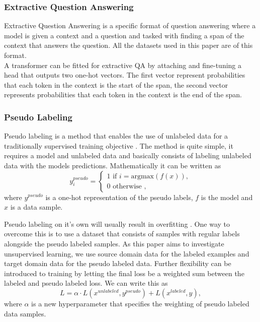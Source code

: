 \documentclass[twoside,twocolumn]{article}
\begin{document}
\subsubsection{Extractive Question Answering}
Extractive Question Answering is a specific format of question answering where a
model is given a context and a question and tasked with finding a span of the
context that answers the question. All the datasets used in this paper are of
this format. \\

A transformer can be fitted for extractive QA by attaching and
fine-tuning a head that outputs two one-hot vectors. The first vector represent
probabilities that each token in the context is the start of the span, the
second vector represents probabilities that each token in the context is the end
of the span.

\subsubsection{Pseudo Labeling}
Pseudo labeling is a method that enables the use of unlabeled data for a
traditionally supervised training objective \cite{lee2013pseudo}. The method is quite
simple, it requires a model and unlabeled data and basically consists of labeling unlabeled data with the models
predictions. Mathematically it can be written as 
\begin{equation}
\label{eq:pseudo}
	y_i^{pseudo} = 
\begin{cases}
	1 \text{ if } i = \text{argmax}(f(x)), \\
	0 \text{ otherwise },
\end{cases}
\end{equation}
where $y^{pseudo}$ is a one-hot representation of the pseudo labels, $f$ is the
model and $x$ is a data sample. 

Pseudo labeling on it's own will usually result in overfitting
\cite{lee2013pseudo}.
One way to overcome this is to use a dataset that consists of samples with
regular labels alongside the pseudo labeled samples. As this paper aims to
investigate unsupervised learning, we use source domain data for the labeled
examples and target domain data for the pseudo labeled data. Further flexibility
can be introduced to training by letting the final loss be a weighted sum
between the labeled and pseudo labeled loss. We can write this as 
\begin{equation}
	\label{eq:pseudo_weight}
	L = \alpha \cdot L(x^{unlabeled}, y^{pseudo}) + L(x^{labeled}, y),
\end{equation}
where $\alpha$ is a new hyperparameter that specifies the weighting of pseudo
labeled data samples. 
\end{document}
